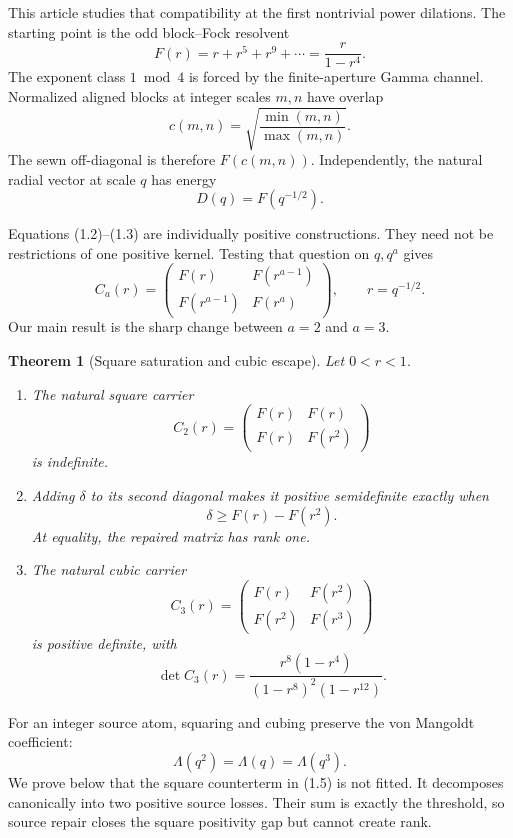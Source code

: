 \documentclass[11pt]{article}
\newtheorem{theorem}{Theorem}[section]
\theoremstyle{definition}
\theoremstyle{remark}
\newcommand{\LambdaVM}{\Lambda}
\begin{document}
This article studies that compatibility at the first nontrivial power dilations.  The starting
point is the odd block--Fock resolvent
\[
 F(r)=r+r^5+r^9+\cdots=\frac{r}{1-r^4}.                 \tag{1.1}
\]
The exponent class $1\bmod4$ is forced by the finite-aperture Gamma channel.  Normalized aligned
blocks at integer scales $m,n$ have overlap
\[
 c(m,n)=\sqrt{\frac{\min(m,n)}{\max(m,n)}}.             \tag{1.2}
\]
The sewn off-diagonal is therefore $F(c(m,n))$.  Independently, the natural radial vector at
scale $q$ has energy
\[
 D(q)=F(q^{-1/2}).                                      \tag{1.3}
\]

Equations (1.2)--(1.3) are individually positive constructions.  They need not be restrictions
of one positive kernel.  Testing that question on $q,q^a$ gives
\[
 C_a(r)=
 \begin{pmatrix}
 F(r)&F(r^{a-1})\\
 F(r^{a-1})&F(r^a)
 \end{pmatrix},
 \qquad r=q^{-1/2}.                                    \tag{1.4}
\]
Our main result is the sharp change between $a=2$ and $a=3$.

\begin{theorem}[Square saturation and cubic escape]
\label{thm:main}
Let $0<r<1$.
\begin{enumerate}
\item The natural square carrier
\[
 C_2(r)=
 \begin{pmatrix}F(r)&F(r)\\F(r)&F(r^2)\end{pmatrix}
\]
is indefinite.
\item Adding $\delta$ to its second diagonal makes it positive semidefinite exactly when
\[
 \delta\geq F(r)-F(r^2).                               \tag{1.5}
\]
At equality, the repaired matrix has rank one.
\item The natural cubic carrier
\[
 C_3(r)=
 \begin{pmatrix}F(r)&F(r^2)\\F(r^2)&F(r^3)\end{pmatrix}
\]
is positive definite, with
\[
 \det C_3(r)=
 \frac{r^8(1-r^4)}{(1-r^8)^2(1-r^{12})}.              \tag{1.6}
\]
\end{enumerate}
\end{theorem}

For an integer source atom, squaring and cubing preserve the von Mangoldt coefficient:
\[
 \LambdaVM(q^2)=\LambdaVM(q)=\LambdaVM(q^3).           \tag{1.7}
\]
We prove below that the square counterterm in (1.5) is not fitted.  It decomposes canonically
into two positive source losses.  Their sum is exactly the threshold, so source repair closes the
square positivity gap but cannot create rank.
\end{document}
